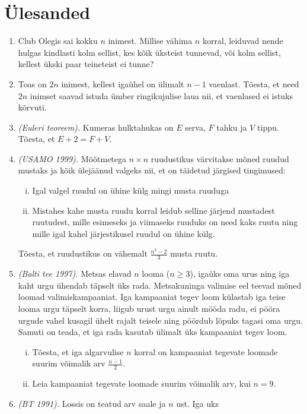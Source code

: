 \documentclass{article}
\begin{document}
\section{Ülesanded}
\begin{enumerate}
\item Club Olegis sai kokku $n$ inimest. Millise vähima $n$ korral,
  leiduvad nende hulgas kindlasti kolm sellist, kes kõik üksteist
  tunnevad, või kolm sellist, kellest ükski paar teineteist ei tunne?
\item Toas on $2n$ inimest, kellest igaühel on ülimalt $n - 1$
  vaenlast. Tõesta, et need $2n$ inimset saavad istuda ümber
  ringikujulise laua nii, et vaenlased ei istuks kõrvuti.
\item \emph{(Euleri teoreem).} Kumeras hulktahukas on $E$ serva, $F$
  tahku ja $V$ tippu. Tõesta, et $E + 2 = F + V$.
\item \emph{(USAMO 1999).}  Mõõtmetega $n \times n$ ruudustikus
  värvitakse mõned ruudud mustaks ja kõik ülejäänud valgeks nii, et on
  täidetud järgised tingimused:
  \begin{enumerate}[(i)]
  \item Igal valgel ruudul on ühine külg mingi musta ruuduga
  \item Mistahes kahe musta ruudu korral leidub selline järjend
    mustadest ruutudest, mille esimeseks ja viimaseks ruuduks on need
    kaks ruutu ning mille igal kahel järjestikusel ruudul on ühine
    külg.
  \end{enumerate}
  Tõesta, et ruudustikus on vähemalt $\frac{n^2 - 2}{3}$ musta ruutu.
\item \emph{(Balti tee 1997).} Metsas elavad $n$ looma ($n \geq 3$),
  igaüks oma urus ning iga kaht urgu ühendab täpselt üks
  rada. Metsakuninga valimise eel teevad mõned loomad
  valimiskampaaniat. Iga kampaaniat tegev loom külastab iga teise
  looma urgu täpselt korra, liigub urust urgu ainult mööda radu, ei
  pööra urgude vahel kusagil ühelt rajalt teisele ning pöördub lõpuks
  tagasi oma urgu. Samuti on teada, et iga rada kasutab ülimalt üks
  kampaaniat tegev loom.
  \begin{enumerate}[(i)]
  \item Tõesta, et iga algarvulise $n$ korral on kampaaniat tegevate
    loomade suurim võimalik arv $\frac{n - 1}{2}$.
  \item Leia kampaaniat tegevate loomade suurim võimalik arv, kui
    $n=9$.
  \end{enumerate}
\item \emph{(BT 1991).} Lossis on teatud arv saale ja $n$ ust. Iga uks

\end{enumerate}
\end{document}
